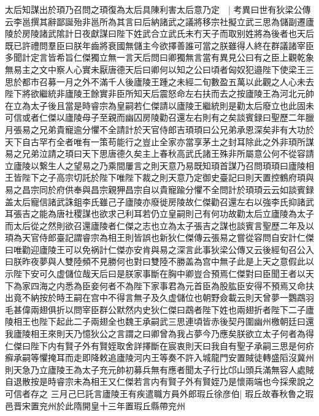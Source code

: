 太后知謀出於頊乃召問之頊復為太后具陳利害太后意乃定　|{
	考異曰世有狄梁公傳云李邕撰其辭鄙誕殆非邕所為其言曰后納諸武之議將移宗社擬立武三思為儲副遷廬陵於房陵諸武隂計日夜獻謀曰陛下姓武合立武氏未冇天子而取别姓將為後者也天后既已許禮問羣臣曰朕年齒將衰國無儲主今欲擇善誰可當之朕雖得人終在群議諸宰臣多聞計定言皆希旨仁傑獨立無一言天后問曰卿獨無言當有異見公曰有之臣上觀乾象無易主之文中察人心實未厭唐德天后曰卿何以知之公曰頃者匈奴犯邉陛下使梁王三思於都市召募一月之外不滿千人後廬陵王踵之未經二旬數盈五萬以此觀之人心未去陛下將欲繼統非廬陵王餘實非臣所知天后震怒命左右扶而去之按廬陵王為河北元帥在立為太子後且當是時睿宗為皇嗣若仁傑請以廬陵王繼統則是勸太后廢立也此固未可信或者仁傑以廬陵母子至親而幽囚房陵勸召還左右則有之矣談賓録曰聖歷二年臘月張易之兄弟貴寵逾分懼不全請計於天官侍郎吉頊頊曰公兄弟承恩深矣非有大功於天下自古罕冇全者唯有一策苟能行之豈止全家亦當享茅土之封耳除此之外非頊所謀易之兄弟泣請之頊曰天下思唐德久矣主上春秋高武氏諸王殊非所屬意公何不從容請立廬陵以繋生人之望易之乃乘間屢言之則天意乃易既知頊首謀乃召問頊頊曰廬陵相王皆陛下之子高宗切託於陛下唯陛下裁之則天意乃定御史臺記曰則天置控鶴府頊與易之昌宗同於府供奉與昌宗親狎昌宗自以貴寵踰分懼不全問計於頊頊云云如談賓録盖太后寵信諸武誅鉏李氏雖己子廬陵亦廢徙房陵故仁傑勸召還左右以強李氏抑諸武耳張吉之能為唐社稷謀也欲求己利耳若仍立皇嗣則己有何功故勸太后立廬陵為太子而太后從之然則欲召還廬陵者仁傑之志也立為太子張吉之謀也談賓言聖歷二年及以頊為天官侍郎臺記謂睿宗為相王則皆誤也新狄仁傑傳云張易之嘗從容問自安計仁傑曰唯勸迎廬陵王可以免祸計仁傑亦安肯與易之深言此事狄梁公傳又云後經旬召公入曰朕昨夜夢與人雙陸頻不見勝何也對曰雙陸不勝盖為宫中無子此是上天之意假此以示陛下安可久虚儲位哉天后曰是朕家事斷在胸中卿豈合預焉仁傑對曰臣聞王者以天下為家四海之内悉為臣妾何者不為陛下家事君為元首臣為股肱臣安得不預焉又命扶出竟不納按於時王嗣在宫中不得言無子及久虚儲位也朝野僉載云則天曾夢一鸚鵡羽毛甚偉兩翅俱折以問宰臣群公默然内史狄仁傑曰鵡者陛下姓也兩翅折者陛下二子廬陵相王也陛下起此二子兩翅全也魏王承嗣武三思連頃皆赤後契丹圍幽州檄朝廷曰還我廬陵相王來則天乃憶狄公之言謂之曰卿曾為我占夢今乃應矣朕欲立太子何者為得仁傑曰陛下内有賢子外有賢姪取舍詳擇斷在宸衷則天曰我自有聖子承嗣三思是何疥癬承嗣等懼掩耳而走即降敕追廬陵河内王等奏不許入城龍門安置賊徒轉盛䧟沒冀州則天急乃立廬陵王為太子充元帥初募兵無有應者聞太子行比邙山頭兵滿無容人處賊自退散按是時睿宗未為相王又仁傑若言内有賢子外有賢姪乃是懷兩端也今採衆說之可信者存之}
三月己巳託言廬陵王有疾遣職方員外郎瑕丘徐彦伯|{
	瑕丘故春秋魯之瑕邑晋宋置兖州於此隋開皇十三年置瑕丘縣帶兖州}
